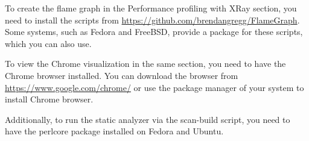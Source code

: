 To create the flame graph in the Performance profiling with XRay section, you need to install the scripts from \url{https://github.com/brendangregg/FlameGraph}. Some systems, such as Fedora and FreeBSD, provide a package for these scripts, which you can also use.

To view the Chrome visualization in the same section, you need to have the Chrome browser installed. You can download the browser from \url{https://www.google.com/chrome/} or use the package manager of your system to install Chrome browser.

Additionally, to run the static analyzer via the scan-build script, you need to have the perlcore package installed on Fedora and Ubuntu.